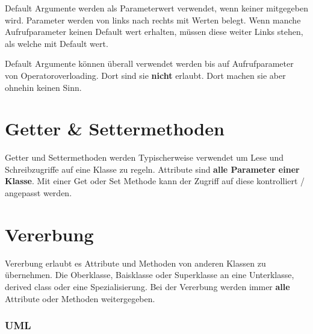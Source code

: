 Default Argumente werden als Parameterwert verwendet, wenn keiner mitgegeben wird.
Parameter werden von links nach rechts mit Werten belegt. 
Wenn manche Aufrufparameter keinen Default wert erhalten, müssen diese weiter Links stehen, als welche mit Default wert.  



Default Argumente können überall verwendet werden bis auf Aufrufparameter von Operatoroverloading. 
Dort sind sie \textbf{nicht} erlaubt. 
Dort machen sie aber ohnehin keinen Sinn. 

\section{Getter \& Settermethoden}

Getter und Settermethoden werden Typischerweise verwendet um Lese und Schreibzugriffe auf eine Klasse zu regeln. 
Attribute sind \textbf{alle Parameter einer Klasse}. 
Mit einer Get oder Set Methode kann der Zugriff auf diese kontrolliert / angepasst werden.\\



\section{Vererbung}

Vererbung erlaubt es Attribute und Methoden von anderen Klassen zu übernehmen. 
Die Oberklasse, Baisklasse oder Superklasse  an eine Unterklasse, derived class oder eine Spezialisierung. 
Bei der Vererbung werden immer \textbf{alle} Attribute oder Methoden weitergegeben. 

\subsubsection{UML}


